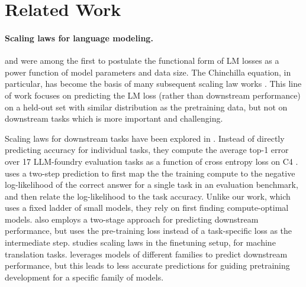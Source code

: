 \section{Related Work}
\label{sec:related}


\paragraph{Scaling laws for language modeling.}
\citet{Kaplan2020ScalingLF} and \citet{Hoffmann2022TrainingCL} were among the first to postulate the functional form of LM losses as a power function of model parameters and data size.
The Chinchilla equation, in particular, has become the basis of many subsequent scaling law works \citep{Muennighoff2023ScalingDL,Gadre2024LanguageMS,Zhang2024MAPNeoHC}.
This line of work focuses on predicting the LM loss (rather than downstream performance) on a held-out set with similar distribution as the pretraining data, but not on downstream tasks which is more important and challenging.

Scaling laws for downstream tasks have been explored in \citet{Gadre2024LanguageMS}. Instead of directly predicting accuracy for individual tasks, they compute the average top-1 error over 17 LLM-foundry \citep{mosaicml_llm_foundry} evaluation tasks as a function of cross entropy loss on C4 \citep{Raffel2019ExploringTL}. \citet{Dubey2024TheL3} uses a two-step prediction to first map the the training compute to the negative log-likelihood of the correct answer for a single task in an evaluation benchmark, and then relate the log-likelihood to the task accuracy. Unlike our work, which uses a fixed ladder of small models, they rely on first finding compute-optimal models. %
\citet{Chen2024ScalingLF} also employs a two-stage approach for predicting downstream performance, but uses the pre-training loss instead of a task-specific loss as the intermediate step.
\citet{Isik2024ScalingLF} studies scaling laws in the finetuning setup, for machine translation tasks. \citet{polo2025slothscalinglawsllm} leverages models of different families to predict downstream performance, but this leads to less accurate predictions for guiding pretraining development for a specific family of models.
